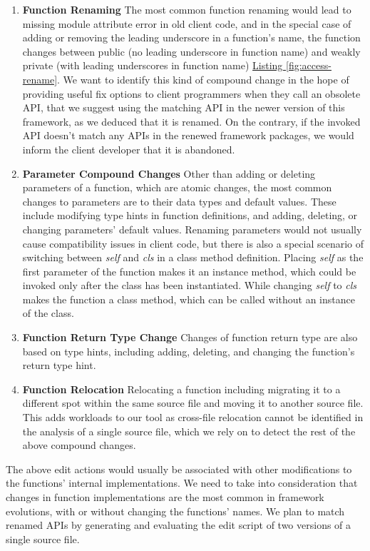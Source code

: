 \begin{enumerate}
  \item \textbf{Function Renaming}
  The most common function renaming would lead to missing module attribute error in old client code, and in the special case of adding or removing the leading underscore in a function's name, the function changes between public (no leading underscore in function name) and weakly private (with leading underscores in function name) \hyperref[fig:access-rename]{Listing \ref*{fig:access-rename}}. We want to identify this kind of compound change in the hope of providing useful fix options to client programmers when they call an obsolete API, that we suggest using the matching API in the newer version of this framework, as we deduced that it is renamed. On the contrary, if the invoked API doesn't match any APIs in the renewed framework packages, we would inform the client developer that it is abandoned.
  \item \textbf{Parameter Compound Changes}
  Other than adding or deleting parameters of a function, which are atomic changes, the most common changes to parameters are to their data types and default values. These include modifying type hints in function definitions, and adding, deleting, or changing parameters' default values. Renaming parameters would not usually cause compatibility issues in client code, but there is also a special scenario of switching between \textit{self} and \textit{cls} in a class method definition. Placing \textit{self} as the first parameter of the function makes it an instance method, which could be invoked only after the class has been instantiated. While changing \textit{self} to \textit{cls} makes the function a class method, which can be called without an instance of the class.
  \item \textbf{Function Return Type Change}
  Changes of function return type are also based on type hints, including adding, deleting, and changing the function's return type hint.
  \item \textbf{Function Relocation}
  Relocating a function including migrating it to a different spot within the same source file and moving it to another source file. This adds workloads to our tool as cross-file relocation cannot be identified in the analysis of a single source file, which we rely on to detect the rest of the above compound changes.
\end{enumerate}

\begin{figure}[!t]
  
  \vspace{-5mm}
\end{figure}

The above edit actions would usually be associated with other modifications to the functions' internal implementations. We need to take into consideration that changes in function implementations are the most common in framework evolutions, with or without changing the functions' names. We plan to match renamed APIs by generating and evaluating the edit script of two versions of a single source file.
